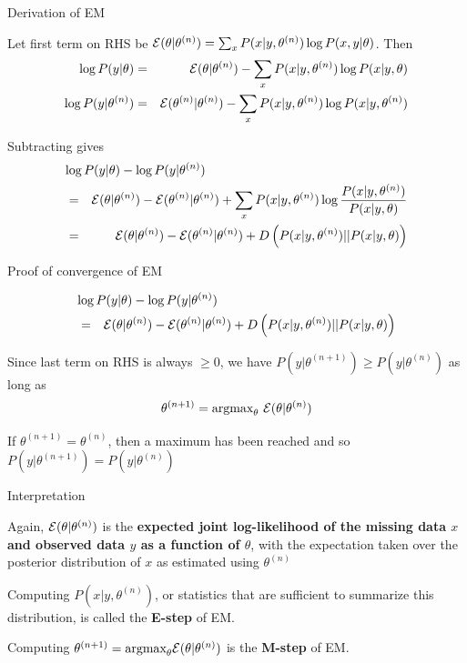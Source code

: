\documentclass{beamer}
\begin{document}
\begin{frame}{Derivation of EM}

\itemb
  \item Let first term on RHS be ${\cal E}(\theta|\theta^{(n)}) = \sum_x P(x|y,\theta^{(n)}) \log P(x,y|\theta)$. Then
\begin{eqnarray*}
\log P(y|\theta) & = & {\cal E}(\theta|\theta^{(n)}) - \sum_x P(x|y,\theta^{(n)}) \log P(x|y,\theta) \\
\log P(y|\theta^{(n)}) & = & {\cal E}(\theta^{(n)}|\theta^{(n)}) - \sum_x P(x|y,\theta^{(n)}) \log P(x|y,\theta^{(n)})
\end{eqnarray*}
  \item Subtracting gives
\begin{eqnarray*}
\lefteqn{\log P(y|\theta) - \log P(y|\theta^{(n)})} \\
& = & {\cal E}(\theta|\theta^{(n)}) - {\cal E}(\theta^{(n)}|\theta^{(n)}) + \sum_x P(x|y,\theta^{(n)}) \log \frac{P(x|y,\theta^{(n)})}{P(x|y,\theta)} \\
& = & {\cal E}(\theta|\theta^{(n)}) - {\cal E}(\theta^{(n)}|\theta^{(n)}) + D\left(P(x|y,\theta^{(n)}) || P(x|y,\theta)\right)
\end{eqnarray*}
 \iteme

\end{frame}

\begin{frame}{Proof of convergence of EM}

\begin{eqnarray*}
\lefteqn{\log P(y|\theta) - \log P(y|\theta^{(n)})} \\
& = & {\cal E}(\theta|\theta^{(n)}) - {\cal E}(\theta^{(n)}|\theta^{(n)}) + D\left(P(x|y,\theta^{(n)}) || P(x|y,\theta)\right)
\end{eqnarray*}

\itemb
  \item Since last term on RHS is always $\geq 0$, we have $P(y|\theta^{(n+1)}) \geq P(y|\theta^{(n)})$ as long as
\[
\theta^{(n+1)} = \mbox{argmax}_{\theta}\ {\cal E}(\theta|\theta^{(n)})
\]
  \item If $\theta^{(n+1)} = \theta^{(n)}$, then a maximum has been reached and so $P(y|\theta^{(n+1)}) = P(y|\theta^{(n)})$
 \iteme

\end{frame}

\begin{frame}{Interpretation}

\itemb
  \item Again, ${\cal E}(\theta|\theta^{(n)})$ is the {\bf expected joint log-likelihood of the missing data $x$ and observed data $y$ as a function of $\theta$},
with the expectation taken over the posterior distribution of $x$ as estimated using $\theta^{(n)}$
  \item Computing $P(x|y,\theta^{(n)})$, or statistics that are sufficient to summarize this distribution, is called the {\bf E-step} of EM.
  \item Computing $\theta^{(n+1)} = \mbox{argmax}_{\theta} {\cal E}(\theta|\theta^{(n)})$ is the {\bf M-step} of EM.
 \iteme

\end{frame}
\end{document}
